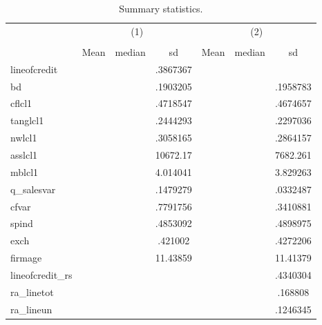 \begin{table}[htbp]\centering
\def\sym#1{\ifmmode^{#1}\else\(^{#1}\)\fi}
\caption{Summary statistics.}
\begin{tabular}{l*{2}{ccc}}
\hline\hline
            &\multicolumn{3}{c}{(1)}               &\multicolumn{3}{c}{(2)}               \\
            &\multicolumn{3}{c}{}                  &\multicolumn{3}{c}{}                  \\
            &        Mean&      median&          sd&        Mean&      median&          sd\\
\hline
lineofcredit&            &            &    .3867367&            &            &            \\
bd          &            &            &    .1903205&            &            &    .1958783\\
cflcl1      &            &            &    .4718547&            &            &    .4674657\\
tanglcl1    &            &            &    .2444293&            &            &    .2297036\\
nwlcl1      &            &            &    .3058165&            &            &    .2864157\\
asslcl1     &            &            &    10672.17&            &            &    7682.261\\
mblcl1      &            &            &    4.014041&            &            &    3.829263\\
q\_salesvar  &            &            &    .1479279&            &            &    .0332487\\
cfvar       &            &            &    .7791756&            &            &    .3410881\\
spind       &            &            &    .4853092&            &            &    .4898975\\
exch        &            &            &     .421002&            &            &    .4272206\\
firmage     &            &            &    11.43859&            &            &    11.41379\\
lineofcredit\_rs&            &            &            &            &            &    .4340304\\
ra\_linetot  &            &            &            &            &            &     .168808\\
ra\_lineun   &            &            &            &            &            &    .1246345\\

\end{tabular}
\end{table}
